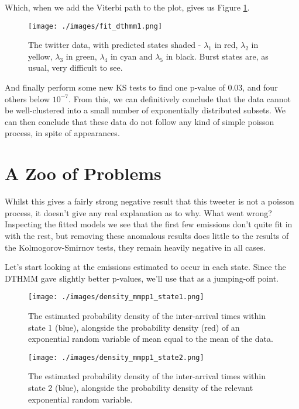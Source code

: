 Which, when we add the Viterbi path to the plot, gives us Figure \ref{fit_dthmm1}.

\begin{figure}[h!]
\texttt{[image: ./images/fit\_dthmm1.png]}
\caption{The twitter data, with predicted states shaded - $\lambda_1$ in red, $\lambda_2$ in yellow, $\lambda_3$ in green, $\lambda_4$ in cyan and $\lambda_5$ in black. Burst states are, as usual, very difficult to see.}
\label{fit_dthmm1}
\end{figure}

And finally perform some new KS tests to find one p-value of 0.03, and four others below $10^{-7}$. From this, we can definitively conclude that the data cannot be well-clustered into a small number of exponentially distributed subsets. We can then conclude that these data do not follow any kind of simple poisson process, in spite of appearances.

\section{A Zoo of Problems}

Whilst this gives a fairly strong negative result that this tweeter is not a poisson process, it doesn't give any real explanation as to why. What went wrong? Inspecting the fitted models we see that the first few emissions don't quite fit in with the rest, but removing these anomalous results does little to the results of the Kolmogorov-Smirnov tests, they remain heavily negative in all cases.

Let's start looking at the emissions estimated to occur in each state. Since the DTHMM gave slightly better p-values, we'll use that as a jumping-off point.

\begin{figure}[h!]
\texttt{[image: ./images/density\_mmpp1\_state1.png]}
\caption{The estimated probability density of the inter-arrival times within state 1 (blue), alongside the probability density (red) of an exponential random variable of mean equal to the mean of the data.}
\label{density_mmpp1_state1}
\end{figure}

\begin{figure}[h!]
\texttt{[image: ./images/density\_mmpp1\_state2.png]}
\caption{The estimated probability density of the inter-arrival times within state 2 (blue), alongside the probability density of the relevant exponential random variable.}
\label{density_mmpp1_state2}
\end{figure}

